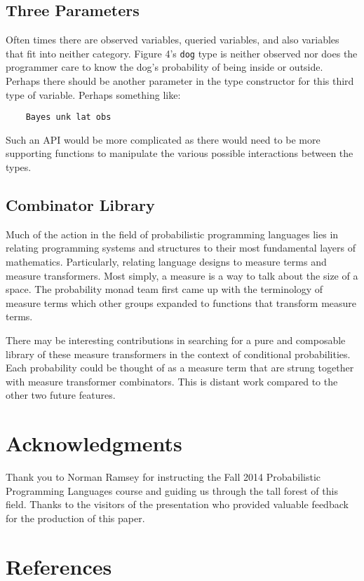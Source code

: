 \documentclass[10pt,twocolumn]{article}
\begin{document}
\subsection{Three Parameters}
Often times there are observed variables, queried variables, and also variables that fit into neither category. Figure 4's \texttt{dog} type is neither observed nor does the programmer care to know the dog's probability of being inside or outside. Perhaps there should be another parameter in the type constructor for this third type of variable. Perhaps something like:
\begin{verbatim}
    Bayes unk lat obs
\end{verbatim}
Such an API would be more complicated as there would need to be more supporting functions to manipulate the various possible interactions between the types.

\subsection{Combinator Library}
Much of the action in the field of probabilistic programming languages lies in relating programming systems and structures to their most fundamental layers of mathematics. Particularly, relating language designs to measure terms and measure transformers. Most simply, a measure is a way to talk about the size of a space. The probability monad team first came up with the terminology of measure terms which other groups expanded to functions that transform measure terms.

There may be interesting contributions in searching for a pure and composable library of these measure transformers in the context of conditional probabilities. Each probability could be thought of as a measure term that are strung together with measure transformer combinators. This is distant work compared to the other two future features.

\section{Acknowledgments}
Thank you to Norman Ramsey for instructing the Fall 2014 Probabilistic Programming Languages course and guiding us through the tall forest of this field. Thanks to the visitors of the presentation who provided valuable feedback for the production of this paper.

\section{References}
\end{document}
